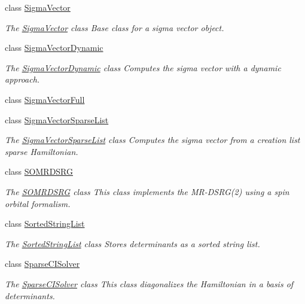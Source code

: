 \begin{DoxyCompactItemize}
class \mbox{\hyperlink{classforte_1_1_sigma_vector}{Sigma\+Vector}}
\begin{DoxyCompactList}\small\item\em The \mbox{\hyperlink{classforte_1_1_sigma_vector}{Sigma\+Vector}} class Base class for a sigma vector object. \end{DoxyCompactList}\item 
class \mbox{\hyperlink{classforte_1_1_sigma_vector_dynamic}{Sigma\+Vector\+Dynamic}}
\begin{DoxyCompactList}\small\item\em The \mbox{\hyperlink{classforte_1_1_sigma_vector_dynamic}{Sigma\+Vector\+Dynamic}} class Computes the sigma vector with a dynamic approach. \end{DoxyCompactList}\item 
class \mbox{\hyperlink{classforte_1_1_sigma_vector_full}{Sigma\+Vector\+Full}}
\item 
class \mbox{\hyperlink{classforte_1_1_sigma_vector_sparse_list}{Sigma\+Vector\+Sparse\+List}}
\begin{DoxyCompactList}\small\item\em The \mbox{\hyperlink{classforte_1_1_sigma_vector_sparse_list}{Sigma\+Vector\+Sparse\+List}} class Computes the sigma vector from a creation list sparse Hamiltonian. \end{DoxyCompactList}\item 
class \mbox{\hyperlink{classforte_1_1_s_o_m_r_d_s_r_g}{S\+O\+M\+R\+D\+S\+RG}}
\begin{DoxyCompactList}\small\item\em The \mbox{\hyperlink{classforte_1_1_s_o_m_r_d_s_r_g}{S\+O\+M\+R\+D\+S\+RG}} class This class implements the M\+R-\/\+D\+S\+RG(2) using a spin orbital formalism. \end{DoxyCompactList}\item 
class \mbox{\hyperlink{classforte_1_1_sorted_string_list}{Sorted\+String\+List}}
\begin{DoxyCompactList}\small\item\em The \mbox{\hyperlink{classforte_1_1_sorted_string_list}{Sorted\+String\+List}} class Stores determinants as a sorted string list. \end{DoxyCompactList}\item 
class \mbox{\hyperlink{classforte_1_1_sparse_c_i_solver}{Sparse\+C\+I\+Solver}}
\begin{DoxyCompactList}\small\item\em The \mbox{\hyperlink{classforte_1_1_sparse_c_i_solver}{Sparse\+C\+I\+Solver}} class This class diagonalizes the Hamiltonian in a basis of determinants. \end{DoxyCompactList}\item 

\end{DoxyCompactItemize}
